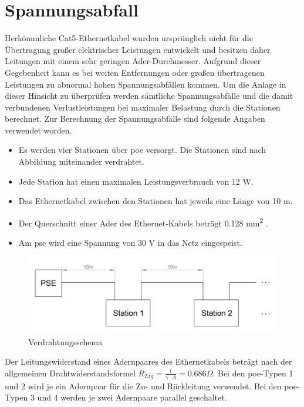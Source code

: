\wip
\section{Spannungsabfall}
Herkömmliche Cat5-Ethernetkabel wurden ursprünglich nicht für die Übertragung großer elektrischer Leistungen entwickelt und besitzen daher Leitungen mit einem sehr geringen Ader-Durchmesser.
Aufgrund dieser Gegebenheit kann es bei weiten Entfernungen oder großen übertragenen Leistungen zu abnormal hohen Spannungsabfällen kommen.
Um die Anlage in dieser Hinsicht zu überprüfen werden sämtliche Spannungsabfälle und die damit verbundenen Verlustleistungen bei maximaler Belastung durch die Stationen berechnet.
Zur Berechnung der Spannungsabfälle sind folgende Angaben verwendet worden.
\begin{itemize}
	\item Es werden vier Stationen über \ac{poe} versorgt.
	Die Stationen sind nach Abbildung  miteinander verdrahtet.
	\item Jede Station hat einen maximalen Leistungsverbrauch von 12 W.
	\item Das Ethernetkabel zwischen den Stationen hat jeweils eine Länge von 10 m.
	\item Der Querschnitt einer Ader des Ethernet-Kabels beträgt 0.128 mm\textsuperscript{2} \cite[vgl.][]{lapp-cat5-datasheet}.
	\item Am \ac{pse} wird eine Spannung von 30 V in das Netz eingespeist.
\end{itemize}
\begin{figure}[htbp!]
	\centering
	\includegraphics[width=.9\linewidth]{images/berechnung/poe_verdrahtung.png}
	\caption{Verdrahtungsschema}
	\label{fig:poe-verdrahtung}
\end{figure}
Der Leitungswiderstand eines Adernpaares des Ethernetkabels beträgt nach der allgemeinen Drahtwiderstandsformel $R_{Ltg}=\frac{l}{\gamma\cdot A}=0.686\Omega$.
Bei den \ac{poe}-Typen 1 und 2 wird je ein Adernpaar für die Zu- und Rückleitung verwendet.
Bei den \ac{poe}-Typen 3 und 4 werden je zwei Adernpaare parallel geschaltet.\par

